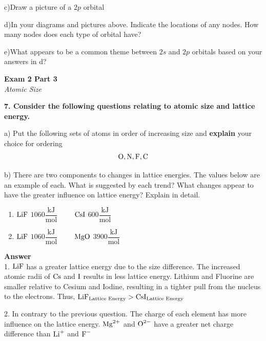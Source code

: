 \documentclass{article}
\begin{document}
    c)Draw a picture of a $2p$ orbital

    d)In your diagrams and pictures above. Indicate the locations of any nodes. How many nodes does each type of orbital have?

    e)What appears to be a common theme between $2s$ and $2p$ orbitals based on your answers in d?


    \pagebreak

    \begin{center}
        \textbf{Exam 2 Part 3}\\
        \textit{Atomic Size}
    \end{center}
    \textbf{7. Consider the following questions relating to atomic size and lattice energy.}

    a) Put the following sets of atoms in order of increasing size and \textbf{explain} your choice for ordering
    $$\ce{O}, \ce{N}, \ce{F}, \ce{C}$$

    b) There are two components to changes in lattice energies. The values below are an example of each. What is suggested by each trend? What changes appear to have the greater influence on lattice energy? Explain in detail.
    \begin{enumerate}
        \item $\ce{LiF}$ $1060 \dfrac{\si{\kilo\joule}}{\si{\mole}} \qquad$ $\ce{CsI}$  $600 \dfrac{\si{\kilo\joule}}{\si{\mole}}$
        \item  $\ce{LiF}$ $1060 \dfrac{\si{\kilo\joule}}{\si{\mole}} \qquad$ $\ce{MgO}$  $3900 \dfrac{\si{\kilo\joule}}{\si{\mole}}$
    \end{enumerate}
    \textbf{Answer}\\

    1. $\ce{LiF}$ has a greater lattice energy due to the size difference. The increased atomic radii of $\ce{Cs}$ and $\ce{I}$ results in less lattice energy. Lithium and Fluorine are smaller relative to Cesium and Iodine, resulting in a tighter pull from the nucleus to the electrons. Thus, $\ce{LiF}_{\text{Lattice Energy}} > \ce{CsI}_{\text{Lattice Energy}}$

    2. In contrary to the previous question. The charge of each element has more influence on the lattice energy. $\ce{Mg^{2+}}$ and $\ce{O^{2-}}$ have a greater net charge difference than $\ce{Li^{+}}$ and $\ce{F^{-}}$
    \pagebreak
\end{document}
